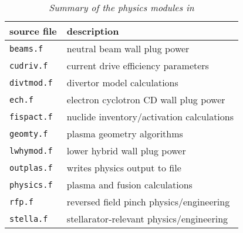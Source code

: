 
\begin{table}
\begin{center}

\begin{tabular}{||l||l||} \hline
source file   & description \\ \hline
\tt beams.f   & \rm neutral beam wall plug power \\
\tt cudriv.f  & \rm current drive efficiency parameters \\
\tt divtmod.f & \rm divertor model calculations\\
\tt ech.f     & \rm electron cyclotron CD wall plug power \\
\tt fispact.f & \rm nuclide inventory/activation calculations \\
\tt geomty.f  & \rm plasma geometry algorithms \\
\tt lwhymod.f & \rm lower hybrid wall plug power \\
\tt outplas.f & \rm writes physics output to file \\
\tt physics.f & \rm plasma and fusion calculations \\
\tt rfp.f     & \rm reversed field pinch physics/engineering \\
\tt stella.f  & \rm stellarator-relevant physics/engineering \\ \hline
\end{tabular}
\end{center}
\caption[TABLE_PHY]{{\it
Summary of the physics modules in \PSD
}}
\label{tab:physics}
\end{table}
